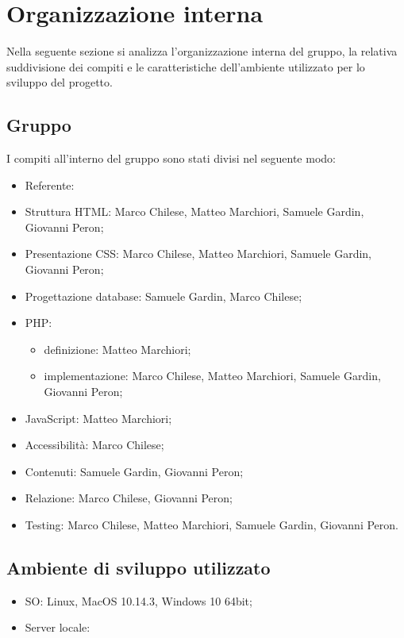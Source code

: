 \section{Organizzazione interna}
Nella seguente sezione si analizza l'organizzazione interna del gruppo, la relativa suddivisione dei compiti e le caratteristiche dell'ambiente utilizzato per lo sviluppo del progetto.
\subsection{Gruppo}
I compiti all'interno del gruppo sono stati divisi nel seguente modo:
\begin{itemize}
\item Referente:
\item Struttura HTML: Marco Chilese, Matteo Marchiori, Samuele Gardin, Giovanni Peron;
\item Presentazione CSS: Marco Chilese, Matteo Marchiori, Samuele Gardin, Giovanni Peron;
\item Progettazione database: Samuele Gardin, Marco Chilese;
\item PHP: 
\begin{itemize}
	\item definizione: Matteo Marchiori;
	\item implementazione: Marco Chilese, Matteo Marchiori, Samuele Gardin, Giovanni Peron;
\end{itemize}
\item JavaScript: Matteo Marchiori;
\item Accessibilità: Marco Chilese;
\item Contenuti: Samuele Gardin, Giovanni Peron;
\item Relazione: Marco Chilese, Giovanni Peron;
\item Testing: Marco Chilese, Matteo Marchiori, Samuele Gardin, Giovanni Peron.
\end{itemize}
\subsection{Ambiente di sviluppo utilizzato}
\begin{itemize}
	\item SO: Linux, MacOS 10.14.3, Windows 10 64bit;
	\item Server locale:
\end{itemize}

